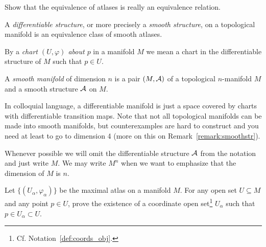 \begin{exercise}
  Show that the equivalence of atlases is really an equivalence relation.
\end{exercise}

\begin{definition}\label{def:diffstr}
  A \emph{differentiable structure}, or more precisely a \emph{smooth structure}, on a topological manifold is an equivalence class of smooth atlases.
\end{definition}

\begin{notation}
  By a \emph{chart $(U, \varphi)$ about $p$} in a manifold $M$ we mean a chart in the differentiable structure of $M$ such that $p\in U$.
\end{notation}

\begin{definition}\label{def:diffmanifold}
  A \emph{smooth manifold} of dimension $n$ is a pair $(M, \mathcal{A})$ of a topological $n$-manifold $M$ and a smooth structure $\mathcal{A}$ on $M$.
\end{definition}

In colloquial language, a differentiable manifold is just a space covered by charts with differentiable transition maps.
Note that not all topological manifolds can be made into smooth manifolds, but counterexamples are hard to construct and you need at least to go to dimension 4 (more on this on Remark~\ref{remark:smoothstr}).

\begin{notation}
  Whenever possible we will omit the differentiable structure $\mathcal{A}$ from the notation and just write $M$.
  We may write $M^n$ when we want to emphasize that the dimension of $M$ is $n$.
\end{notation}

\begin{exercise}
  Let $\{(U_\alpha, \varphi_\alpha)\}$ be the maximal atlas on a manifold $M$.
  For any open set $U\subseteq M$ and any point $p\in U$, prove the existence of a coordinate open set\footnote{Cf. Notation~\ref{def:coords_obj}.} $U_\alpha$ such that $p\in U_\alpha\subset U$.
\end{exercise}

